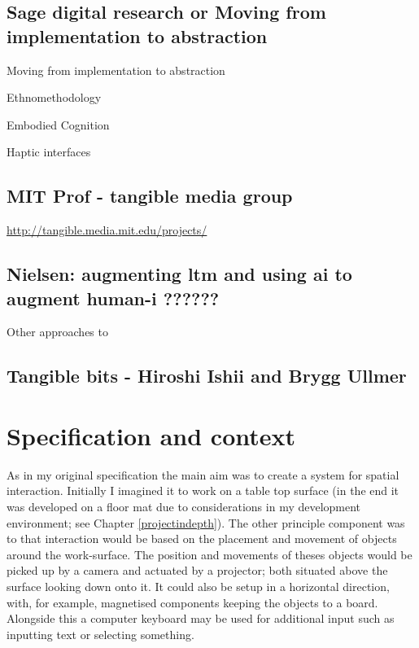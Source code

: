 \documentclass[12pt]{report}
\begin{document}
\section{Sage digital research or Moving from implementation to abstraction}
\label{sec:org8384c79}

Moving from implementation to abstraction

Ethnomethodology

Embodied Cognition

Haptic interfaces

\section{MIT Prof - tangible media group}
\label{sec:org4db6d1b}
\url{http://tangible.media.mit.edu/projects/}
\section{Nielsen: augmenting ltm and using ai to augment human-i ??????}
\label{sec:orgad0de1b}

Other approaches to 

\cite{NielsenMich2018altm}

\cite{carter2017using}  

\section{Tangible bits - Hiroshi Ishii  and  Brygg Ullmer}
\label{sec:org3665adb}
\cite{IshiiH2002Tbdt}

\chapter{Specification and context}
\label{sec:org980da24}

As in my original specification the main aim was to create a system for spatial
interaction. Initially I imagined it to work on a table top surface (in the end
it was developed on a floor mat due to considerations in my development
environment; see Chapter \ref{projectindepth}). The other principle component was
to that interaction would be based on the placement and movement of objects
around the work-surface. The position and movements of theses objects would be
picked up by a camera and actuated by a projector; both situated above the
surface looking down onto it. It could also be setup in a horizontal direction,
with, for example, magnetised components keeping the objects to a board.
Alongside this a computer keyboard may be used for additional input such as
inputting text or selecting something. \\
\end{document}
